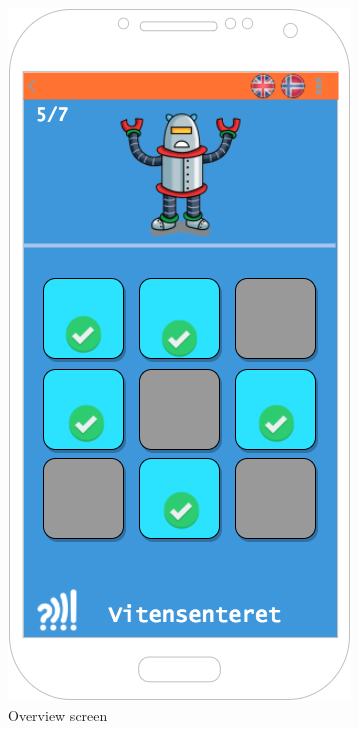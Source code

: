 \begin{figure}[H]
\begin{minipage}[t]{0.35\textwidth}
    \label{fig:welcomeScreen}
  \end{minipage}
  \hfill
  \begin{minipage}[t]{0.35\textwidth}
    \includegraphics[width=\textwidth]{images/sketches/MainScreen.png}
    \caption{Overview screen}
  \end{minipage}
\end{figure}

